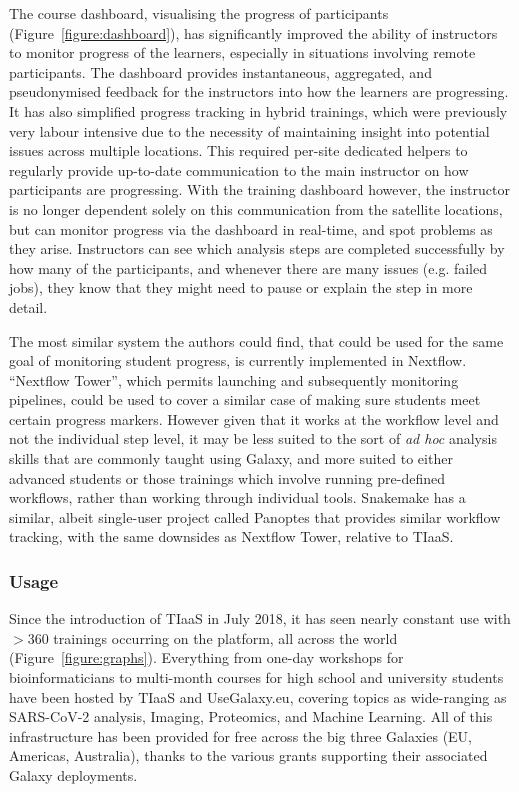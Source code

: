 \documentclass[a4paper,num-refs]{oup-contemporary}
\begin{document}
The course dashboard, visualising the progress of participants (Figure~\ref{figure:dashboard}), has significantly improved the ability of instructors to monitor progress of the learners, especially in situations involving remote participants. The dashboard provides instantaneous, aggregated, and pseudonymised feedback for the instructors into how the learners are progressing. It has also simplified progress tracking in hybrid trainings, which were previously very labour intensive due to the necessity of maintaining insight into potential issues across multiple locations. This required per-site dedicated helpers to regularly provide up-to-date communication to the main instructor on how participants are progressing. With the training dashboard however, the instructor is no longer dependent solely on this communication from the satellite locations, but can monitor progress via the dashboard in real-time, and spot problems as they arise. Instructors can see which analysis steps are completed successfully by how many of the participants, and whenever there are many issues (e.g. failed jobs), they know that they might need to pause or explain the step in more detail.

The most similar system the authors could find, that could be used for the same goal of monitoring student progress, is currently implemented in Nextflow. ``Nextflow Tower''\cite{nf-tower}, which permits launching and subsequently monitoring pipelines, could be used to cover a similar case of making sure students meet certain progress markers. However given that it works at the workflow level and not the individual step level, it may be less suited to the sort of \textit{ad hoc} analysis skills that are commonly taught using Galaxy, and more suited to either advanced students or those trainings which involve running pre-defined workflows, rather than working through individual tools. Snakemake has a similar, albeit single-user project called Panoptes that provides similar workflow tracking\cite{panoptes}, with the same downsides as Nextflow Tower, relative to TIaaS.

\subsubsection{Usage}
Since the introduction of TIaaS in July 2018, it has seen nearly constant use with $>$360 trainings occurring on the platform, all across the world (Figure~\ref{figure:graphs}).
Everything from one-day workshops for bioinformaticians to multi-month courses for high school and university students have been hosted by TIaaS and UseGalaxy.eu, covering topics as wide-ranging as SARS-CoV-2 analysis, Imaging, Proteomics, and Machine Learning. All of this infrastructure has been provided for free across the big three Galaxies (EU, Americas, Australia), thanks to the various grants supporting their associated Galaxy deployments.
\end{document}
